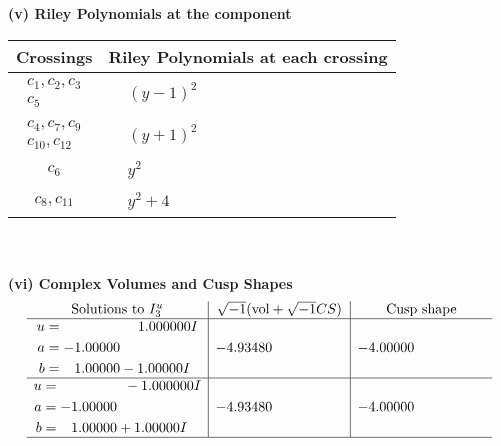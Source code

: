\documentclass[1p]{elsarticle_modified}
\theoremstyle{definition}
\newcommand{\I}{\sqrt{-1}}
\begin{document}
\newpage\renewcommand{\arraystretch}{1}
\flushleft \textbf{(v) Riley Polynomials at the component}\newline \\
\begin{tabular}{m{50pt}|m{274pt}}
Crossings & \hspace{64pt}Riley Polynomials at each crossing \\
\hline $$\begin{aligned}c_{1},c_{2},c_{3}\\c_{5}\end{aligned}$$&$\begin{aligned}
&(y-1)^2
\end{aligned}$\\
\hline $$\begin{aligned}c_{4},c_{7},c_{9}\\c_{10},c_{12}\end{aligned}$$&$\begin{aligned}
&(y+1)^2
\end{aligned}$\\
\hline $$\begin{aligned}c_{6}\end{aligned}$$&$\begin{aligned}
&y^2
\end{aligned}$\\
\hline $$\begin{aligned}c_{8},c_{11}\end{aligned}$$&$\begin{aligned}
&y^2+4
\end{aligned}$\\
\hline
\end{tabular}\\~\\
\newpage\flushleft \textbf{(vi) Complex Volumes and Cusp Shapes}
$$\begin{array}{c|c|c}  
\text{Solutions to }I^u_{3}& \I (\text{vol} + \sqrt{-1}CS) & \text{Cusp shape}\\
 \hline 
\begin{aligned}
u &= \phantom{-0.000000 -}1.000000 I \\
a &= -1.00000\phantom{ +0.000000I} \\
b &= \phantom{-}1.00000 - 1.00000 I\end{aligned}
 & -4.93480\phantom{ +0.000000I} & -4.00000\phantom{ +0.000000I} \\ \hline\begin{aligned}
u &= \phantom{-0.000000 } -1.000000 I \\
a &= -1.00000\phantom{ +0.000000I} \\
b &= \phantom{-}1.00000 + 1.00000 I\end{aligned}
 & -4.93480\phantom{ +0.000000I} & -4.00000\phantom{ +0.000000I}\\
 \hline 
 \end{array}$$\newpage\newpage\renewcommand{\arraystretch}{1}
\end{document}
